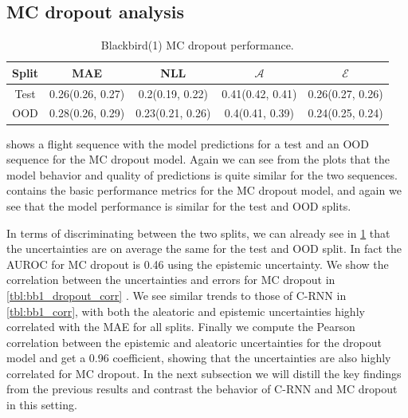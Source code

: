 \clearpage
\subsection{MC dropout analysis}

\begin{table}[ht]
\centering
    \begin{tabular}{c  c  c   c  c }  
        \toprule
        Split & MAE & NLL & $\mathcal{A}$ & $\mathcal{E}$\\
        \midrule
        Test & 0.26(0.26, 0.27) & 0.2(0.19, 0.22) & 0.41(0.42, 0.41) &  0.26(0.27, 0.26)\\
        OOD  &  0.28(0.26, 0.29) &  0.23(0.21, 0.26) & 0.4(0.41, 0.39)&  0.24(0.25, 0.24)\\
        \midrule
    \end{tabular}
    \caption{Blackbird(1) MC dropout performance.}
    \label{tbl:bb1_dropout}
\end{table}

  
  
  

 shows a flight sequence with the model predictions for a test and an OOD sequence for the MC dropout model. Again we can see from the plots that the model behavior and quality of predictions is quite similar for the two sequences.  contains the basic performance metrics for the MC dropout model, and again we see that the model performance is similar for the test and OOD splits.

In terms of discriminating between the two splits, we can already see in \cref{tbl:bb1_dropout} that the uncertainties are on average the same for the test and OOD split. In fact the AUROC for MC dropout is 0.46 using the epistemic uncertainty. We show the correlation between the uncertainties and errors for MC dropout in \cref{tbl:bb1_dropout_corr} . We see similar trends to those of C-RNN in \cref{tbl:bb1_corr}, with both the aleatoric and epistemic uncertainties highly correlated with the MAE for all splits. Finally we compute the Pearson correlation between the epistemic and aleatoric uncertainties for the dropout model and get a 0.96 coefficient, showing that the uncertainties are also highly correlated for MC dropout. In the next subsection we will distill the key findings from the previous results and contrast the behavior of C-RNN and MC dropout in this setting.

